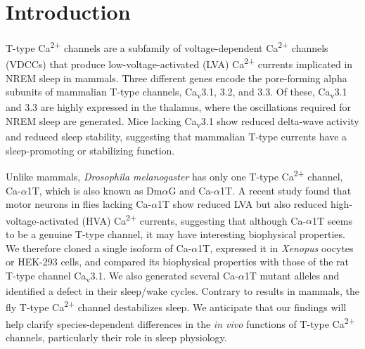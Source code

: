 \section*{Introduction}

T-type Ca\textsuperscript{2+} channels are a subfamily of voltage-dependent Ca\textsuperscript{2+} channels (VDCCs) that produce low-voltage-activated (LVA) Ca\textsuperscript{2+} currents implicated in NREM sleep in mammals\cite{Lee:2004ey}.
Three different genes encode the pore-forming alpha subunits of mammalian T-type channels, Ca\textsubscript{v}3.1, 3.2, and 3.3. Of these, Ca\textsubscript{v}3.1 and 3.3 are highly expressed in the thalamus, where the oscillations required for NREM sleep are generated\cite{steriade:1991aa, dossi:1992aa, talley:1999aa}.
Mice lacking Ca\textsubscript{v}3.1 show reduced delta-wave activity and reduced sleep stability, suggesting that mammalian T-type currents have a sleep-promoting or stabilizing function\cite{Lee:2004ey}.

Unlike mammals, \emph{Drosophila melanogaster} has only one T-type Ca\textsuperscript{2+} channel, Ca-$\alpha$1T, which is also known as Dm$\alpha$G and Ca-$\alpha$1T.
A recent study found that motor neurons in flies lacking Ca-$\alpha$1T show reduced LVA but also reduced high-voltage-activated (HVA) Ca\textsuperscript{2+} currents, suggesting that although Ca-$\alpha$1T seems to be a genuine T-type channel, it may have interesting biophysical properties\cite{Ryglewski:2012jk}.
We therefore cloned a single isoform of Ca-$\alpha$1T,  expressed it in \emph{Xenopus} oocytes or HEK-293 cells, and compared its biophysical properties with those of the rat T-type channel Ca\textsubscript{v}3.1.
We also generated several Ca-$\alpha$1T mutant alleles and identified a defect in their sleep/wake cycles. Contrary to results in mammals, the fly T-type Ca\textsuperscript{2+} channel destabilizes sleep.
We anticipate that our findings will help clarify species-dependent differences in the \emph{in vivo} functions of T-type Ca\textsuperscript{2+} channels, particularly their role in sleep physiology.
